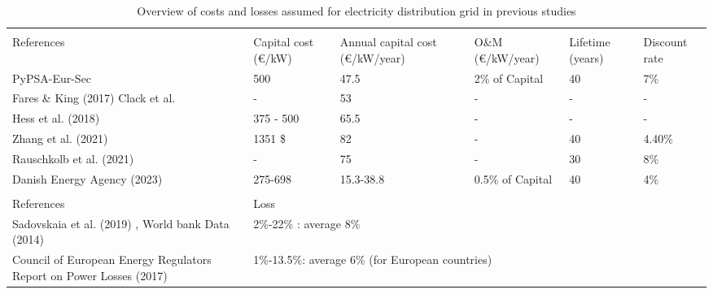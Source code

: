 \documentclass[review]{elsarticle}
\begin{document}
	\begin{table}[H]
		\caption{ Overview of costs and losses assumed for electricity distribution
			grid in previous studies}
		\scriptsize
		\begin{tabular}{m{3cm}m{1.5cm}m{1.5cm}m{2cm}m{1.3cm}m{1.3cm}}
			\hline
			\rowcolor{Mercury}
			\multicolumn{6}{l}{\textbf{Distribution grid costs}} \\ 
			References & Capital cost (€/kW) &  Annual capital cost (€/kW/year) & O\&M (€/kW/year) & Lifetime (years) & Discount rate \\
			\hline
			PyPSA-Eur-Sec \cite{pypsa_costs,blanco2018potential,hess_2018} & 500 & 47.5 & 2\% of Capital & 40 & 7\% \\
			Fares \& King (2017) \cite{fares_2017} Clack et al. \cite{clack_2020}  & - & 53 & - & - & - \\
			Hess et al. \cite{hess_2018} (2018) & 375 - 500 & 65.5 & - & - & - \\
			Zhang et al. (2021) \cite{zhang_2021} & 1351 \$ & 82  & - & 40 & 4.40\% \\
			Rauschkolb et al. (2021) \cite{rauschkolb_2021} & - & 75 & - & 30 & 8\% \\
			Danish Energy Agency (2023) \cite{DEA_2023_energytransport}  & 275-698 & 15.3-38.8 & 0.5\%  of Capital & 40 & 4\% \\ \hline
			\rowcolor{Mercury}
			\multicolumn{6}{l}{\textbf{Distribution grid losses}} \\ 
			References & Loss &  &  &  &  \\
			\hline
			Sadovskaia et al. (2019) \cite{sadovskaia_2019}, World bank Data (2014) \cite{worldbsnk_2014} & \multicolumn{3}{l}{2\%-22\% : average 8\%}   \\
			Council of European Energy Regulators Report on Power Losses (2017) \cite{ceer_2017} & \multicolumn{5}{l}{1\%-13.5\%: average 6\%    (for European countries)} \\ \bottomrule
		\end{tabular}
	\end{table}
	
\end{document}
